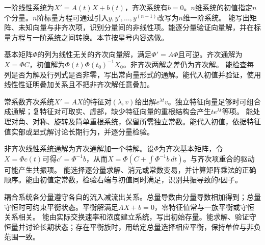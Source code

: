 {一阶线性系统为$X'=A(t)X+b(t)$，齐次系统有$b=0$。$n$维系统的初值指定$n$个分量。$n$阶标量方程可通过引入$y,y',\ldots,y^{(n-1)}$改写为$n$维一阶系统。}
{能写出矩阵、未知向量与非齐次项，识别分量间的非线性项。能逐分量验证向量解，并在标量方程与一阶系统之间转换。本节按星号内容选做。}

{基本矩阵$\Phi$的列为线性无关的齐次向量解，满足$\Phi'=A\Phi$且可逆。齐次通解为$X=\Phi C$，初值解为$\Phi(t)\Phi(t_0)^{-1}X_0$。非齐次两解之差仍为齐次解。}
{能检查每列是否为解及行列式是否非零，写出常向量形式的通解。能代入初值并验证，使用线性性证明叠加关系且不把非齐次解任意叠加。}

{常系数齐次系统$X'=AX$的特征对$(\lambda,v)$给出解$e^{\lambda t}v$。独立特征向量足够时可组合成通解；复特征对可取实、虚部，缺少特征向量的重根结构会产生$t e^{\lambda t}$等项。}
{能处理对角、对称、旋转及简单重根系统，保留所需独立常数。能代入初值，依据特征值实部或显式解讨论长期行为，并逐分量检验。}

{非齐次线性系统通解为齐次通解加一个特解。设$\Phi$为齐次基本矩阵，令$X=\Phi c(t)$可得$c'=\Phi^{-1}b$，从而$X=\Phi(C+\int\Phi^{-1}b\,dt)$。与齐次项重合的驱动可能产生共振项。}
{能选择逐分量求解、消元或常数变易，并计算矩阵乘法的正确顺序。能由初值定常数，检验右端与初值同时满足，识别共振导致的$t$因子。}

{耦合系统各分量遵守各自的流入减流出关系。总量导数由分量导数相加得到；总量守恒时可约束平衡状态。平衡解满足$AX+b=0$，零特征值常与一族平衡或守恒关系相关。}
{能由实际交换速率和浓度建立系统，写出初始存量。能求解、验证守恒量并讨论长期状态；存在平衡族时，用给定总量选择相应平衡，保持单位与非负范围一致。}
